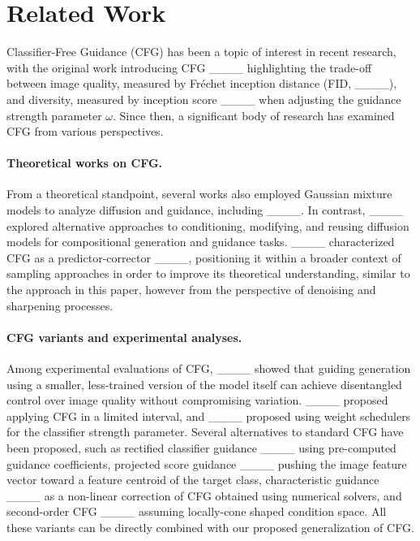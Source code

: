 \section{Related Work}
Classifier-Free Guidance (CFG) has been a topic of interest in recent research, with the original work introducing CFG ____ highlighting the trade-off between image quality, measured by Fréchet inception distance (FID, ____), and diversity, measured by inception score ____ when adjusting the guidance strength parameter $\omega$. Since then, a significant body of research has examined CFG from various perspectives.

\paragraph{Theoretical works on CFG.} From a theoretical standpoint, several works also employed Gaussian mixture models to analyze diffusion and guidance, including ____. In contrast, ____ explored alternative approaches to conditioning, modifying, and reusing diffusion models for compositional generation and guidance tasks. ____ characterized CFG as a predictor-corrector ____, positioning it within a broader context of sampling approaches in order to improve its theoretical understanding, similar to the approach in this paper, however from the perspective of denoising and sharpening processes.


\paragraph{CFG variants and experimental analyses.} Among experimental evaluations of CFG, ____ showed that guiding generation using a smaller, less-trained version of the model itself can achieve disentangled control over image quality without compromising variation. ____ proposed applying CFG in a limited interval, and ____ proposed using weight schedulers for the classifier strength parameter. Several alternatives to standard CFG have been proposed, such as rectified classifier guidance ____ using pre-computed guidance coefficients, projected score guidance ____ pushing the image feature vector toward a feature centroid of the target class, characteristic guidance ____ as a non-linear correction of CFG obtained using numerical solvers, and second-order CFG ____ assuming locally-cone shaped condition space. All these variants can be directly combined with our proposed generalization of CFG.


